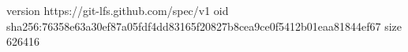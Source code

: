 version https://git-lfs.github.com/spec/v1
oid sha256:76358e63a30ef87a05fdf4dd83165f20827b8cea9ce0f5412b01eaa81844ef67
size 626416
